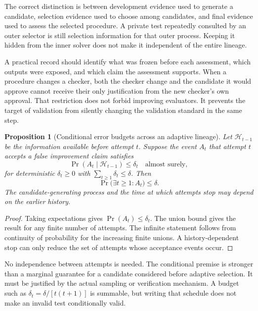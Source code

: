 \documentclass[11pt,letterpaper]{article}
\theoremstyle{plain}
\newtheorem{proposition}[theorem]{Proposition}
\theoremstyle{definition}
\begin{document}
The correct distinction is between development evidence used to generate a candidate, selection evidence used to choose among candidates, and final evidence used to assess the selected procedure. A private test repeatedly consulted by an outer selector is still selection information for that outer process. Keeping it hidden from the inner solver does not make it independent of the entire lineage.

A practical record should identify what was frozen before each assessment, which outputs were exposed, and which claim the assessment supports. When a procedure changes a checker, both the checker change and the candidate it would approve cannot receive their only justification from the new checker's own approval. That restriction does not forbid improving evaluators. It prevents the target of validation from silently changing the validation standard in the same step.

\begin{proposition}[Conditional error budgets across an adaptive lineage]\label{prop:lineage}
Let $\mathcal H_{t-1}$ be the information available before attempt $t$. Suppose the event $A_t$ that attempt $t$ accepts a false improvement claim satisfies
\[
\Pr(A_t\mid\mathcal H_{t-1})\leq\delta_t
\quad\text{almost surely},
\]
for deterministic $\delta_t\geq0$ with $\sum_{t\geq1}\delta_t\leq\delta$. Then
\[
\Pr\big(\exists t\geq1:A_t\big)\leq\delta.
\]
The candidate-generating process and the time at which attempts stop may depend on the earlier history.
\end{proposition}
\begin{proof}
Taking expectations gives $\Pr(A_t)\leq\delta_t$. The union bound gives the result for any finite number of attempts. The infinite statement follows from continuity of probability for the increasing finite unions. A history-dependent stop can only reduce the set of attempts whose acceptance events occur.
\end{proof}

No independence between attempts is needed. The conditional premise is stronger than a marginal guarantee for a candidate considered before adaptive selection. It must be justified by the actual sampling or verification mechanism. A budget such as $\delta_t=\delta/[t(t+1)]$ is summable, but writing that schedule does not make an invalid test conditionally valid.
\end{document}
